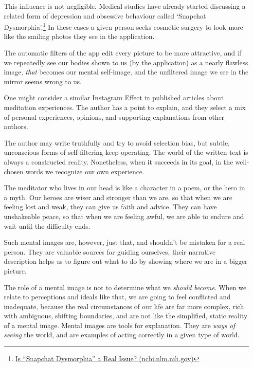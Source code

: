 This influence is not negligible. Medical studies have already started
discussing a related form of depression and obsessive behaviour called
`Snapchat Dysmorphia'.\footnote{\href{https://www.ncbi.nlm.nih.gov/pmc/articles/PMC5933578/}{Is
  ``Snapchat Dysmorphia'' a Real Issue? (ncbi.nlm.nih.gov)}} In these
cases a given person seeks cosmetic surgery to look more like the
smiling photos they see in the application.

The automatic filters of the app edit every picture to be more
attractive, and if we repeatedly see our bodies shown to us (by the
application) as a nearly flawless image, \emph{that} becomes our mental
self-image, and the unfiltered image we see in the mirror seems wrong to
us.

One might consider a similar Instagram Effect in published articles
about meditation experiences. The author has a point to explain, and
they select a mix of personal experiences, opinions, and supporting
explanations from other authors.

The author may write truthfully and try to avoid selection bias, but
subtle, unconscious forms of self-filtering keep operating. The world of
the written text is always a constructed reality. Nonetheless, when it
succeeds in its goal, in the well-chosen words we recognize our own
experience.

\clearpage

\vspace*{-\baselineskip}


The meditator who lives in our head is like a character in a poem, or
the hero in a myth. Our heroes are wiser and stronger than we are, so
that when we are feeling lost and weak, they can give us faith and
advice. They can have unshakeable peace, so that when we are feeling
awful, we are able to endure and wait until the difficulty ends.

Such mental images are, however, just that, and shouldn't be mistaken
for a real person. They are valuable sources for guiding ourselves,
their narrative description helps us to figure out what to do by showing
where we are in a bigger picture.

The role of a mental image is not to determine what we \emph{should
become}. When we relate to perceptions and ideals like that, we are
going to feel conflicted and inadequate, because the real circumstances
of our life are far more complex, rich with ambiguous, shifting
boundaries, and are not like the simplified, static reality of a mental
image. Mental images are tools for explanation. They are \emph{ways of
seeing} the world, and are examples of acting correctly in a given type
of world.

